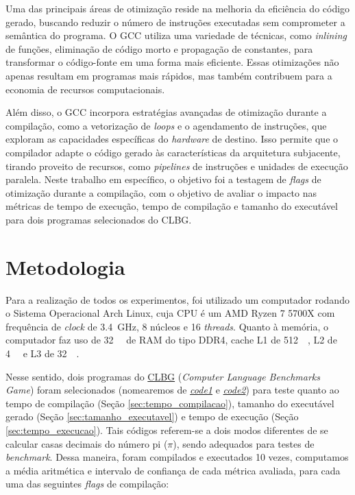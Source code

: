 \documentclass[12pt,a4paper]{article}
\begin{document}
Uma das principais áreas de otimização reside na melhoria da eficiência do código gerado, buscando reduzir o número de instruções executadas sem comprometer a semântica do programa. O GCC utiliza uma variedade de técnicas, como \textit{inlining} de funções, eliminação de código morto e propagação de constantes, para transformar o código-fonte em uma forma mais eficiente. Essas otimizações não apenas resultam em programas mais rápidos, mas também contribuem para a economia de recursos computacionais.

Além disso, o GCC incorpora estratégias avançadas de otimização durante a compilação, como a vetorização de \textit{loops} e o agendamento de instruções, que exploram as capacidades específicas do \textit{hardware} de destino. Isso permite que o compilador adapte o código gerado às características da arquitetura subjacente, tirando proveito de recursos, como \textit{pipelines} de instruções e unidades de execução paralela. Neste trabalho em específico, o objetivo foi a testagem de \textit{flags} de otimização durante a compilação, com o objetivo de avaliar o impacto nas métricas de tempo de execução, tempo de compilação e tamanho do executável para dois programas selecionados do CLBG.

\section{Metodologia} \label{sec:metodologia}

Para a realização de todos os experimentos, foi utilizado um computador rodando o Sistema Operacional Arch Linux, cuja CPU é um AMD Ryzen 7 5700X com frequência de \textit{clock} de \SI{3,4}{\giga\hertz}, 8 núcleos e 16 \textit{threads}. Quanto à memória, o computador faz uso de \SI{32}{\giga\byte} de RAM do tipo DDR4, cache L1 de \SI{512}{\kilo\byte}, L2 de \SI{4}{\mega\byte} e L3 de \SI{32}{\mega\byte}.

Nesse sentido, dois programas do \href{https://benchmarksgame-team.pages.debian.net/benchmarksgame/}{CLBG} (\textit{Computer Language Benchmarks Game}) foram selecionados (nomearemos de \href{https://benchmarksgame-team.pages.debian.net/benchmarksgame/program/pidigits-gcc-1.html}{\textit{code1}} e \href{https://benchmarksgame-team.pages.debian.net/benchmarksgame/program/pidigits-gcc-2.html}{\textit{code2}}) para teste quanto ao tempo de compilação (Seção \ref{sec:tempo_compilacao}), tamanho do executável gerado (Seção \ref{sec:tamanho_executavel}) e tempo de execução (Seção \ref{sec:tempo_execucao}). Tais códigos referem-se a dois modos diferentes de se calcular casas decimais do número pi ($\pi$), sendo adequados para testes de \textit{benchmark}. Dessa maneira, foram compilados e executados 10 vezes, computamos a média aritmética e intervalo de confiança de cada métrica avaliada, para cada uma das seguintes \textit{flags} de compilação:
\end{document}
